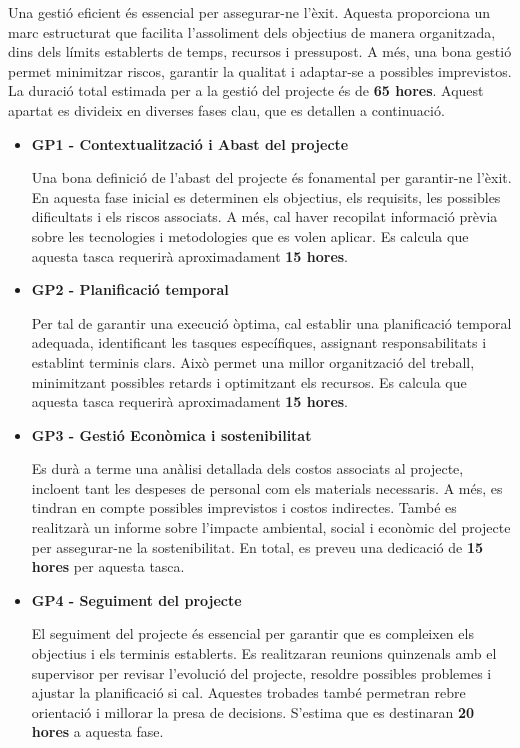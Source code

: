 \documentclass[a4paper,12pt]{report}
\begin{document}
Una gestió eficient és essencial per assegurar-ne l’èxit.
Aquesta proporciona un marc estructurat que facilita l’assoliment dels objectius de manera organitzada, dins dels límits establerts de temps, recursos i pressupost.
A més, una bona gestió permet minimitzar riscos, garantir la qualitat i adaptar-se a possibles imprevistos.
La duració total estimada per a la gestió del projecte és de \textbf{65 hores}. Aquest apartat es divideix en diverses fases clau, que es detallen a continuació.

\begin{itemize}
    \item \textbf{GP1 - Contextualització i Abast del projecte}
    
    Una bona definició de l’abast del projecte és fonamental per garantir-ne l’èxit.
    En aquesta fase inicial es determinen els objectius, els requisits, les possibles dificultats i els riscos associats.
    A més, cal haver recopilat informació prèvia sobre les tecnologies i metodologies que es volen aplicar.
    Es calcula que aquesta tasca requerirà aproximadament \textbf{15 hores}.

    \item \textbf{GP2 - Planificació temporal}
    
    Per tal de garantir una execució òptima, cal establir una planificació temporal adequada, identificant les tasques específiques, assignant responsabilitats i establint terminis clars.
    Això permet una millor organització del treball, minimitzant possibles retards i optimitzant els recursos.
    Es calcula que aquesta tasca requerirà aproximadament \textbf{15 hores}.

    \item \textbf{GP3 - Gestió Econòmica i sostenibilitat}
    
    Es durà a terme una anàlisi detallada dels costos associats al projecte, incloent tant les despeses de personal com els materials necessaris.
    A més, es tindran en compte possibles imprevistos i costos indirectes.
    També es realitzarà un informe sobre l’impacte ambiental, social i econòmic del projecte per assegurar-ne la sostenibilitat.
    En total, es preveu una dedicació de \textbf{15 hores} per aquesta tasca.

    \item \textbf{GP4 - Seguiment del projecte}
    
    El seguiment del projecte és essencial per garantir que es compleixen els objectius i els terminis establerts.
    Es realitzaran reunions quinzenals amb el supervisor per revisar l’evolució del projecte, resoldre possibles problemes i ajustar la planificació si cal.
    Aquestes trobades també permetran rebre orientació i millorar la presa de decisions.
    S’estima que es destinaran \textbf{20 hores} a aquesta fase.
\end{itemize}
\end{document}
